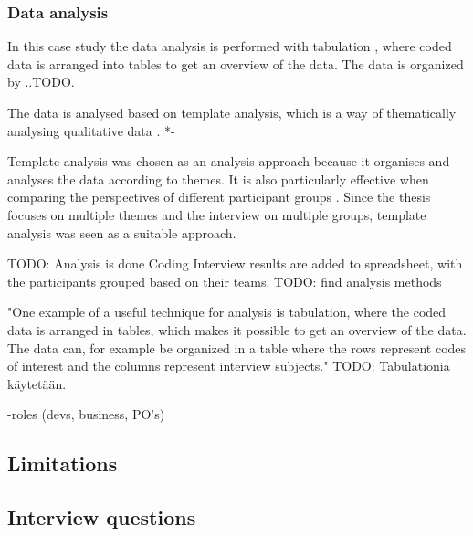 \documentclass[english]{tktltiki2}
\theoremstyle{definition}
\theoremstyle{remark}
\begin{document}
\subsubsection{Data analysis} %
In this case study the data analysis is performed with tabulation \cite{runeson2009guidelines}, where coded data is arranged into tables to get an overview of the data. The data is organized by ..TODO.

The data is analysed based on template analysis, which is a way of thematically analysing qualitative data \cite{king1998template}. *-

Template analysis was chosen as an analysis approach because it organises and analyses the data according to themes. It is also particularly effective when comparing the perspectives of different participant groups \cite{king2004using}. Since the thesis focuses on multiple themes and the interview on multiple groups, template analysis was seen as a suitable approach.   


TODO: Analysis is done \cite{runeson2009guidelines}
Coding
Interview results are added to spreadsheet, with the participants grouped based on their teams. TODO: find analysis methods

"One example of a useful technique for analysis is tabulation, where the coded data is arranged in tables, which makes it possible to get an overview of the data. The data can, for example be organized in a table where the rows represent codes of interest and the columns represent interview subjects." \cite{runeson2009guidelines} TODO: Tabulationia käytetään.

 -roles (devs, business, PO's)


\subsection{Limitations}

\subsection{Interview questions}
\end{document}
